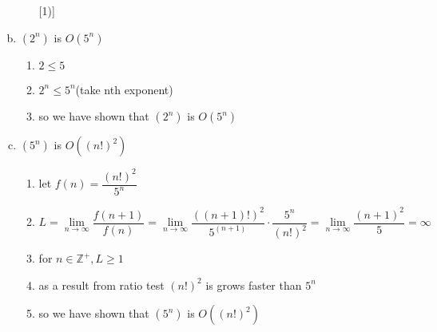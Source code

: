 \documentclass[12pt]{article}
\begin{document}
\begin{enumerate}[a)]
\begin{enumerate} [1)]
    \end{enumerate}
    \item $(2^n)$ is $O(5^n)$
    \begin{enumerate} [1)]
        \item $2 \leq 5$
        \item $2^n \leq 5^n$(take nth exponent)
        \item so we have shown that $(2^n)$ is $O(5^n)$
    \end{enumerate}
    \item $(5^n)$ is $O((n!)^2)$
    \begin{enumerate} [1)]
        \item let $f(n) = \dfrac{(n!)^2}{5^n}$
        \item $L = \lim\limits_{n\to\infty} \dfrac{f(n+1)}{f(n)} = \lim\limits_{n\to\infty} \dfrac{((n+1)!)^2}{5^{(n+1)}} \cdot \dfrac{5^n}{(n!)^2} = \lim\limits_{n\to\infty} \dfrac{(n+1)^2}{5} = \infty$
        \item for $n \in \mathbb{Z}^{+}, L \geq 1 $
        \item as a result from ratio test $(n!)^2$ is grows faster than $5^n$
        \item so we have shown that $(5^n)$ is $O((n!)^2)$
        
    \end{enumerate}
\end{enumerate}
\end{document}
